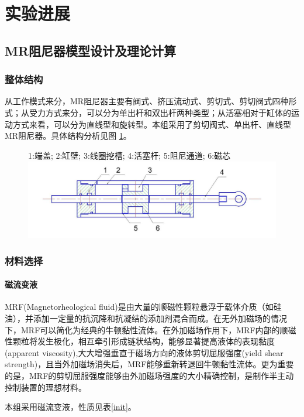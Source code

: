 \section{实验进展}
\subsection{MR阻尼器模型设计及理论计算}
\subsubsection{整体结构}
从工作模式来分，MR阻尼器主要有阀式、挤压流动式、剪切式、剪切阀式四种形式；从受力方式来分，可以分为单出杆和双出杆两种类型；从活塞相对于缸体的运动方式来看，可以分为直线型和旋转型。本组采用了剪切阀式、单出杆、直线型MR阻尼器。具体结构分析见图 \ref{mrdamper}。

\begin{figure}[H]
	\centering
		{1:端盖; 2:缸壁; 3:线圈挖槽; 4:活塞杆; 5:阻尼通道; 6:磁芯}
		\label{mrdamper}
	\includegraphics[width=6in]{figure/mrdamper}
\end{figure}

\subsubsection{材料选择}
\paragraph{磁流变液}
\qquad MRF(Magnetorheological fluid)是由大量的顺磁性颗粒悬浮于载体介质（如硅油），并添加一定量的抗沉降和抗凝结的添加剂混合而成。在无外加磁场的情况下，MRF可以简化为经典的牛顿黏性流体。在外加磁场作用下，MRF内部的顺磁性颗粒将发生极化，相互牵引形成链状结构，能够显著提高液体的表现黏度(apparent viscosity),大大增强垂直于磁场方向的液体剪切屈服强度(yield shear strength)，且当外加磁场消失后，MRF能够重新转退回牛顿黏性流体。更为重要的是，MRF的剪切屈服强度能够由外加磁场强度的大小精确控制，是制作半主动控制装置的理想材料。

本组采用磁流变液，性质见表\ref{init}。

